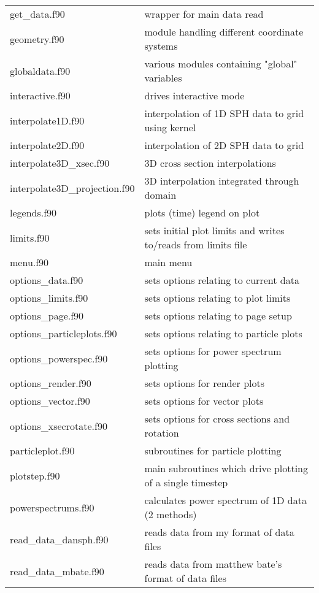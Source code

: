 \documentclass[a4paper,11pt]{article}
\begin{document}
\begin{longtable}{|lp{}|}
     get\_data.f90           & wrapper for main data read\\
     geometry.f90           & module handling different coordinate systems\\
     globaldata.f90         & various modules containing "global" variables\\
     interactive.f90        & drives interactive mode\\
     interpolate1D.f90	 & interpolation of 1D SPH data to grid using kernel\\
     interpolate2D.f90	 & interpolation of 2D SPH data to grid     \\
     interpolate3D\_xsec.f90 & 3D cross section interpolations\\
     interpolate3D\_projection.f90	 & 3D interpolation integrated through domain\\
     legends.f90		       & plots (time) legend on plot\\
     limits.f90                   & sets initial plot limits and writes to/reads from limits file\\
     menu.f90               & main menu\\
     options\_data.f90       & sets options relating to current data\\
     options\_limits.f90     & sets options relating to plot limits\\
     options\_page.f90       & sets options relating to page setup\\
     options\_particleplots.f90 & sets options relating to particle plots\\
     options\_powerspec.f90  & sets options for power spectrum plotting\\
     options\_render.f90	 & sets options for render plots\\
     options\_vector.f90	 & sets options for vector plots\\
     options\_xsecrotate.f90 & sets options for cross sections and rotation\\
     particleplot.f90       & subroutines for particle plotting\\
     plotstep.f90           & main subroutines which drive plotting of a single timestep\\
     powerspectrums.f90     & calculates power spectrum of 1D data (2 methods)\\
     read\_data\_dansph.f90   & reads data from my format of data files\\
     read\_data\_mbate.f90    & reads data from matthew bate's format of data files\\

\end{longtable}
\end{document}

